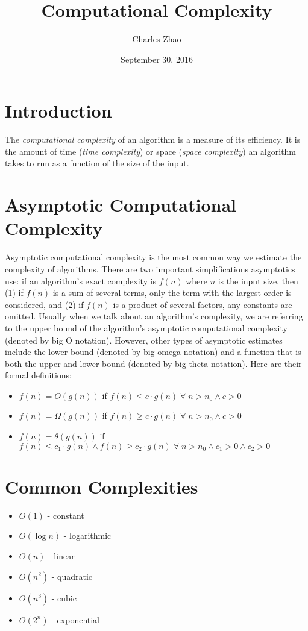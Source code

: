 \documentclass[letterpaper]{article}
\title{Computational Complexity}
\author{Charles Zhao}
\date{September 30, 2016}
\begin{document}
\maketitle

\section{Introduction}
The \emph{computational complexity} of an algorithm is a measure of its efficiency. It is the amount of time (\emph{time complexity}) or space (\emph{space complexity}) an algorithm takes to run as a function of the size of the input.

\section{Asymptotic Computational Complexity}
Asymptotic computational complexity is the most common way we estimate the complexity of algorithms. There are two important simplifications asymptotics use: if an algorithm's exact complexity is $f(n)$ where $n$ is the input size, then (1) if $f(n)$ is a sum of several terms, only the term with the largest order is considered, and (2) if $f(n)$ is a product of several factors, any constants are omitted. Usually when we talk about an algorithm's complexity, we are referring to the upper bound of the algorithm's asymptotic computational complexity (denoted by big O notation). However, other types of asymptotic estimates include the lower bound (denoted by big omega notation) and a function that is both the upper and lower bound (denoted by big theta notation). Here are their formal definitions:
\begin{itemize}
\item $f(n) = O(g(n))$ if $f(n) \le c \cdot g(n) \;\forall\; n>n_{0} \wedge c>0 $
\item $f(n) = \Omega (g(n))$ if $f(n) \ge c \cdot g(n) \;\forall\; n>n_{0} \wedge c>0$
\item $f(n) = \theta (g(n))$ if $f(n) \le c_{1} \cdot g(n) \wedge f(n) \ge c_{2} \cdot g(n) \;\forall\; n>n_{0} \wedge c_{1}>0 \wedge c_{2}>0$
\end{itemize}

\section{Common Complexities}
\begin{itemize}
\item $O(1)$ - constant
\item $O(\log n)$ - logarithmic
\item $O(n)$ - linear
\item $O(n^{2})$ - quadratic
\item $O(n^{3})$ - cubic
\item $O(2^{n})$ - exponential
\end{itemize}
\end{document}
